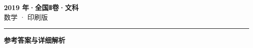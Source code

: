 \documentclass[zihao=5, a4paper]{ctexart}
\begin{document}
\begin{center}
  {\Large\bfseries 2019 年·全国Ⅱ卷·文科}\\[4pt]
  {\large 数学 · 印刷版}
\end{center}
\medskip
{}

\par\bigskip\hrule\bigskip
{}
\begin{center}{\large\bfseries 参考答案与详细解析}\end{center}
\smallskip

\end{document}
